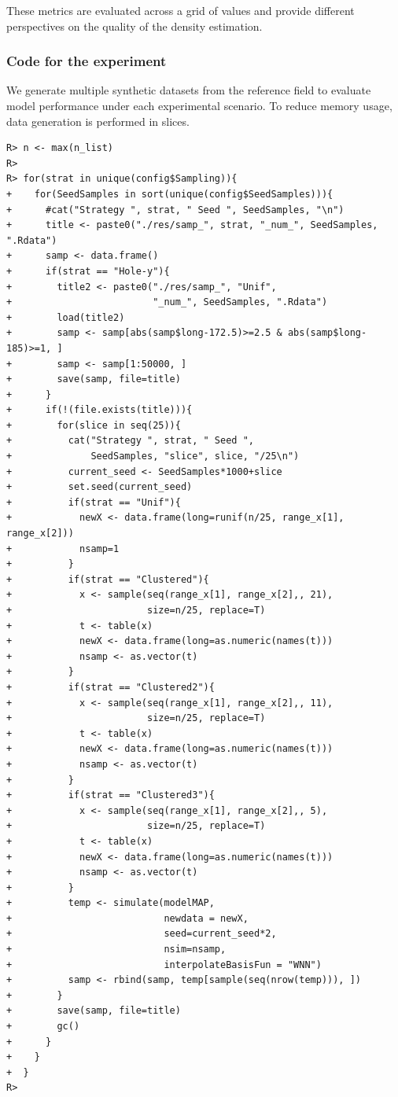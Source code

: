 \documentclass[
]{article}
\begin{document}
These metrics are evaluated across a grid of values and provide different perspectives on the quality of the density estimation.

\subsubsection{Code for the experiment}\label{code-for-the-experiment}

We generate multiple synthetic datasets from the reference field to evaluate model performance under each experimental scenario. To reduce memory usage, data generation is performed in slices.

\begin{verbatim}
R> n <- max(n_list)
R> 
R> for(strat in unique(config$Sampling)){
+    for(SeedSamples in sort(unique(config$SeedSamples))){
+      #cat("Strategy ", strat, " Seed ", SeedSamples, "\n")
+      title <- paste0("./res/samp_", strat, "_num_", SeedSamples, ".Rdata")
+      samp <- data.frame()
+      if(strat == "Hole-y"){
+        title2 <- paste0("./res/samp_", "Unif", 
+                         "_num_", SeedSamples, ".Rdata")
+        load(title2)
+        samp <- samp[abs(samp$long-172.5)>=2.5 & abs(samp$long-185)>=1, ]
+        samp <- samp[1:50000, ]      
+        save(samp, file=title)
+      }
+      if(!(file.exists(title))){
+        for(slice in seq(25)){  
+          cat("Strategy ", strat, " Seed ", 
+              SeedSamples, "slice", slice, "/25\n")
+          current_seed <- SeedSamples*1000+slice
+          set.seed(current_seed)
+          if(strat == "Unif"){
+            newX <- data.frame(long=runif(n/25, range_x[1], range_x[2]))
+            nsamp=1
+          }
+          if(strat == "Clustered"){
+            x <- sample(seq(range_x[1], range_x[2],, 21), 
+                        size=n/25, replace=T)
+            t <- table(x)
+            newX <- data.frame(long=as.numeric(names(t)))
+            nsamp <- as.vector(t)
+          }
+          if(strat == "Clustered2"){
+            x <- sample(seq(range_x[1], range_x[2],, 11), 
+                        size=n/25, replace=T)
+            t <- table(x)
+            newX <- data.frame(long=as.numeric(names(t)))
+            nsamp <- as.vector(t)
+          }
+          if(strat == "Clustered3"){
+            x <- sample(seq(range_x[1], range_x[2],, 5), 
+                        size=n/25, replace=T)
+            t <- table(x)
+            newX <- data.frame(long=as.numeric(names(t)))
+            nsamp <- as.vector(t)
+          }
+          temp <- simulate(modelMAP, 
+                           newdata = newX, 
+                           seed=current_seed*2,
+                           nsim=nsamp, 
+                           interpolateBasisFun = "WNN")
+          samp <- rbind(samp, temp[sample(seq(nrow(temp))), ])
+        }
+        save(samp, file=title)
+        gc()
+      }
+    }
+  }
R> 
\end{verbatim}
\end{document}
